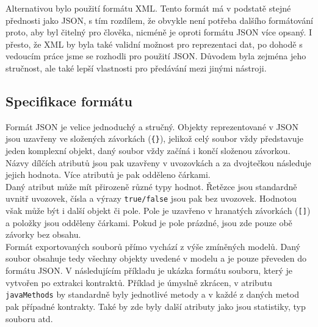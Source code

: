 			Alternativou bylo použití formátu XML. Tento formát má v podstatě stejné přednosti jako JSON, s tím rozdílem, že obvykle není potřeba dalšího formátování proto, aby byl čitelný pro člověka, nicméně je oproti formátu JSON více opsaný. I přesto, že XML by byla také validní možnost pro reprezentaci dat, po dohodě s vedoucím práce jsme se rozhodli pro použití JSON. Důvodem byla zejména jeho stručnost, ale také lepší vlastnosti pro předávání mezi jinými nástroji.
			
		\subsection{Specifikace formátu}
			Formát JSON \cite{jsonSyntax} je velice jednoduchý a stručný. Objekty reprezentované v JSON jsou uzavřeny ve složených závorkách (\texttt{\{\}}), jelikož celý soubor vždy představuje jeden komplexní objekt, daný soubor vždy začíná i končí složenou závorkou. Názvy dílčích atributů jsou pak uzavřeny v uvozovkách a za dvojtečkou následuje jejich hodnota. Více atributů je pak odděleno čárkami.\\
			
			Daný atribut může mít přirozeně různé typy hodnot. Řetězce jsou standardně uvnitř uvozovek, čísla a výrazy \texttt{true/false} jsou pak bez uvozovek. Hodnotou však může být i další objekt či pole. Pole je uzavřeno v hranatých závorkách (\texttt{[]}) a položky jsou odděleny čárkami. Pokud je pole prázdné, jsou zde pouze obě závorky bez obsahu.\\
			
			Formát exportovaných souborů přímo vychází z výše zmíněných modelů. Daný soubor obsahuje tedy všechny objekty uvedené v modelu a je pouze převeden do formátu JSON. V následujícím příkladu je ukázka formátu souboru, který je vytvořen po extrakci kontraktů. Příklad je úmyslně zkrácen, v atributu \texttt{javaMethods} by standardně byly jednotlivé metody a v každé z daných metod pak případné kontrakty. Také by zde byly další atributy jako jsou statistiky, typ souboru atd.\\
							
